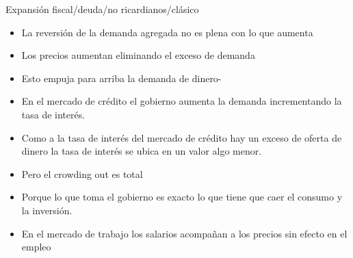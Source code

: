 \documentclass{beamer}
\begin{document}
\begin{frame}{Expansión fiscal/deuda/no ricardianos/clásico}
\begin{itemize}
\item La reversión de la demanda agregada no es plena con lo que aumenta 
\item Los precios aumentan eliminando el exceso de demanda
\item Esto empuja para arriba la demanda de dinero-
\item En el mercado de crédito el gobierno aumenta la demanda incrementando la tasa de interés. 
\item Como a la tasa de interés del mercado de crédito hay un exceso de oferta de dinero la tasa de interés se ubica en un valor algo menor. 
\item Pero el crowding out es total
\item Porque lo que toma el gobierno es exacto lo que tiene que caer el consumo y la inversión. 
\item En el mercado de trabajo los salarios acompañan a los precios sin efecto en el empleo 
\end{itemize}    
\end{frame}
\end{document}
